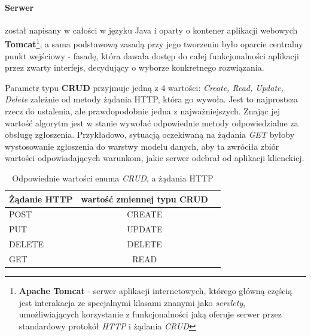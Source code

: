 		\paragraph{Serwer} został napisany w całości w języku Java i oparty o kontener aplikacji webowych 
		\textbf{Tomcat}\footnote{
			\textbf{Apache Tomcat} - serwer aplikacji internetowych, którego główną częścią jest interakacja
			ze specjalnymi klasami znanymi jako \textit{servlety}, umożliwiających korzystanie z funkcjonalności
			jaką oferuje serwer przez standardowy protokół \textit{HTTP} i żądania \textit{CRUD}		
		}, a sama podstawową zasadą przy jego tworzeniu było oparcie centralny punkt wejściowy - fasadę, która dawała
		dostęp do całej funkcjonalności aplikacji przez zwarty interfejs, decydujący o wyborze konkretnego rozwiązania.
		
		Parametr typu \textbf{CRUD} przyjmuje jedną z 4 wartości:
		\textit{Create, Read, Update, Delete} zależnie od metody żądania HTTP, która go wywoła. Jest to najprostsza rzecz
		do ustalenia, ale prawdopodobnie jedna z najważniejszych. Znając jej wartość algorytm jest w stanie wywołać
		odpowiednie metody odpowiedzialne za obsługę zgłoszenia. Przykładowo, sytuacją oczekiwaną na żądania 
		\textit{GET} byłoby wystosowanie zgłoszenia do warstwy modelu danych, aby ta zwróciła zbiór wartości odpowiadających
		warunkom, jakie serwer odebrał od aplikacji klienckiej. 
		
		\begin{table}
			\begin{tabular}[c]{l*{2}{c}}
				Żądanie HTTP	& 	wartość zmiennej typu CRUD	\\
				\hline
				POST			&	CREATE						\\
				PUT				& 	UPDATE						\\
				DELETE			&	DELETE						\\
				GET				& 	READ						\\
			\end{tabular}
			\label{c6:tab:CRUD_matches}
			\caption[Żądania HTTP a enum CRUD]{Odpowiednie wartości enuma \textit{CRUD}, a żądania HTTP}
		\end{table}
		
